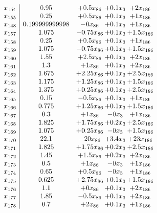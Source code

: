 \documentclass[11pt]{article}
\begin{document}
\[\begin{array}{c| c c@{\hskip 2pt} c@{\hskip 2pt} c@{\hskip 2pt} }
 x_{154}   &  0.95 & + 0.5 x_{86} & + 0.1 x_{3} & + 2 x_{186}\\
 x_{155}   &  0.25 & + 0.5 x_{86} & + 0.1 x_{3} & + 1 x_{186}\\
 x_{148}   &  0.199999999998 & -0 x_{86} & + 0.1 x_{3} & + 1 x_{186}\\
 x_{157}   &  1.075 & -0.75 x_{86} & + 0.1 x_{3} & + 1.5 x_{186}\\
 x_{158}   &  0.25 & + 0.5 x_{86} & + 0.1 x_{3} & + 1 x_{186}\\
 x_{159}   &  1.075 & -0.75 x_{86} & + 0.1 x_{3} & + 1.5 x_{186}\\
 x_{160}   &  1.55 & + 2.5 x_{86} & + 0.1 x_{3} & + 2 x_{186}\\
 x_{161}   &  1.3 & + 1 x_{86} & + 0.1 x_{3} & + 2 x_{186}\\
 x_{162}   &  1.675 & + 2.25 x_{86} & + 0.1 x_{3} & + 2.5 x_{186}\\
 x_{163}   &  1.175 & + 1.25 x_{86} & + 0.1 x_{3} & + 1.5 x_{186}\\
 x_{164}   &  1.375 & + 0.25 x_{86} & + 0.1 x_{3} & + 2.5 x_{186}\\
 x_{165}   &  0.15 & -0.5 x_{86} & + 0.1 x_{3} & + 1 x_{186}\\
 x_{166}   &  0.775 & + 1.25 x_{86} & + 0.1 x_{3} & + 1.5 x_{186}\\
 x_{167}   &  0.3 & + 1 x_{86} & -0 x_{3} & + 1 x_{186}\\
 x_{168}   &  1.825 & + 1.75 x_{86} & + 0.2 x_{3} & + 2.5 x_{186}\\
 x_{169}   &  1.075 & + 0.25 x_{86} & -0 x_{3} & + 1.5 x_{186}\\
 x_{170}   &  22.1 & -20 x_{86} & + 3.4 x_{3} & + 23 x_{186}\\
 x_{171}   &  1.825 & + 1.75 x_{86} & + 0.2 x_{3} & + 2.5 x_{186}\\
 x_{172}   &  1.45 & + 1.5 x_{86} & + 0.2 x_{3} & + 2 x_{186}\\
 x_{173}   &  0.5 & + 1 x_{86} & -0 x_{3} & + 1 x_{186}\\
 x_{174}   &  0.65 & + 0.5 x_{86} & -0 x_{3} & + 1 x_{186}\\
 x_{175}   &  0.625 & + 2.75 x_{86} & + 0.1 x_{3} & + 1.5 x_{186}\\
 x_{176}   &  1.1 & + 0 x_{86} & + 0.1 x_{3} & + 2 x_{186}\\
 x_{177}   &  1.85 & -0.5 x_{86} & + 0.1 x_{3} & + 2 x_{186}\\
 x_{178}   &  0.7 & + 2 x_{86} & + 0.1 x_{3} & + 1 x_{186}\\

\end{array}\]
\end{document}
